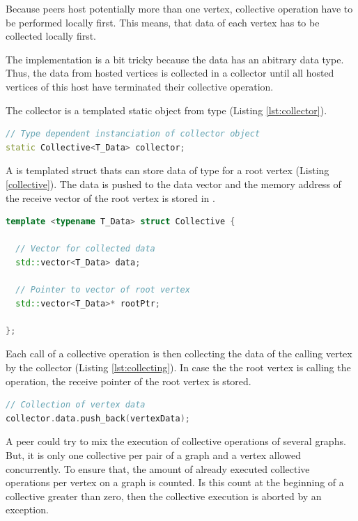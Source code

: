 Because peers host potentially more than one vertex, collective
operation have to be performed locally first. This means, that data of
each vertex has to be collected locally first.

The implementation is a bit tricky because the data has an abitrary
data type. Thus, the data from hosted vertices is collected in a
collector until all hosted vertices of this host have terminated their
collective operation.

The collector is a templated static object from type 
(Listing \ref{lst:collector}).

\begin{lstlisting}[language=C++, label=lst:static_collective]
// Type dependent instanciation of collector object
static Collective<T_Data> collector;
\end{lstlisting}

A  is templated struct thats can store data of type
 for a root vertex (Listing \ref{collective}). The data is
pushed to the data vector and the memory address of the receive vector
of the root vertex is stored in .

\begin{lstlisting}[language=C++, label=lst:collective]
template <typename T_Data> struct Collective { 

  // Vector for collected data
  std::vector<T_Data> data; 

  // Pointer to vector of root vertex
  std::vector<T_Data>* rootPtr; 

};
\end{lstlisting}

Each call of a collective operation is then collecting the data of the
calling vertex by the collector (Listing \ref{lst:collecting}).  In
case the the root vertex is calling the operation, the receive pointer
of the root vertex is stored.

\begin{lstlisting}[language=C++, label=lst:collecting]
// Collection of vertex data
collector.data.push_back(vertexData);
\end{lstlisting}


A peer could try to mix the execution of collective operations of
several graphs. But, it is only one collective per pair of a graph and
a vertex allowed concurrently. To ensure that, the amount of already
executed collective operations per vertex on a graph is counted.  Is
this count at the beginning of a collective greater than zero, then
the collective execution is aborted by an exception.

